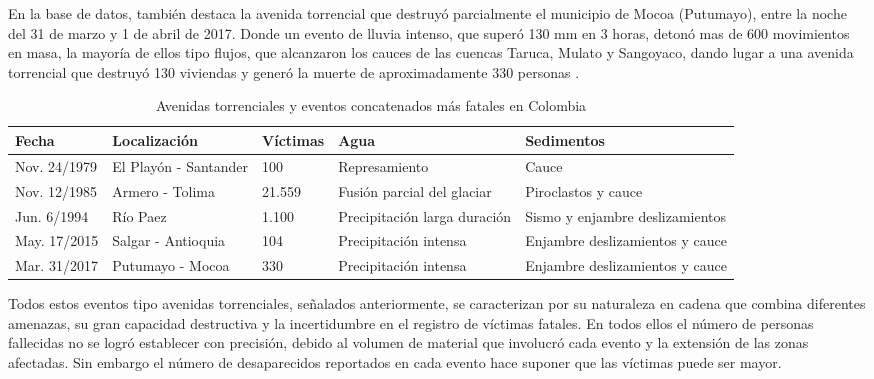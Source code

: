\documentclass{article}
\begin{document}
En la base de datos, también destaca la avenida torrencial que destruyó parcialmente el municipio de Mocoa (Putumayo), entre la noche del 31 de marzo y 1 de abril de 2017. Donde un evento de lluvia intenso, que superó 130 mm en 3 horas, detonó mas de 600 movimientos en masa, la mayoría de ellos tipo flujos, que alcanzaron los cauces de las cuencas Taruca, Mulato y Sangoyaco, dando lugar a una avenida torrencial que destruyó 130 viviendas y generó la muerte de aproximadamente 330 personas \cite{garcia2019dynamic}.


\begin{longtable}{|>{\raggedright}p{1.4cm}|>{\raggedright}p{2.8cm}|>{\raggedright}p{1.6cm}|>{\raggedright}p{2.5cm}|>{\raggedright\arraybackslash}p{2.5cm}|}
\caption{Avenidas torrenciales y eventos concatenados más fatales en Colombia} \label{tabla_avt} \\
\hline
\textbf{Fecha} & \textbf{Localización} & \textbf{Víctimas} & \textbf{Agua} & \textbf{Sedimentos} \\
\hline
Nov. 24/1979 & El Playón - Santander & 100 & Represamiento & Cauce \\
\hline
Nov. 12/1985 & Armero - Tolima & 21.559 & Fusión parcial del glaciar & Piroclastos y cauce \\
\hline
Jun. 6/1994 & Río Paez & 1.100 & Precipitación larga duración & Sismo y enjambre deslizamientos \\
\hline
May. 17/2015 & Salgar - Antioquia & 104 & Precipitación intensa & Enjambre deslizamientos y cauce \\
\hline
Mar. 31/2017 & Putumayo - Mocoa & 330 & Precipitación intensa & Enjambre deslizamientos y cauce \\
\hline
\end{longtable}


Todos estos eventos tipo avenidas torrenciales, señalados anteriormente, se caracterizan por su naturaleza en cadena que combina diferentes amenazas, su gran capacidad destructiva y la incertidumbre en el registro de víctimas fatales. En todos ellos el número de personas fallecidas no se logró establecer con precisión, debido al volumen de material que involucró cada evento y la extensión de las zonas afectadas. Sin embargo el número de desaparecidos reportados en cada evento hace suponer que las víctimas puede ser mayor.
\end{document}
